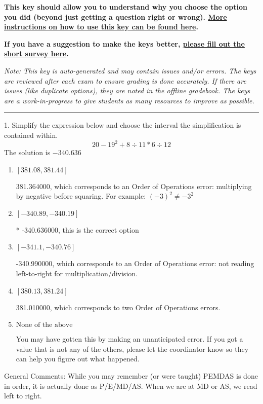\documentclass{article}[14pt]
\begin{document}
\textbf{This key should allow you to understand why you choose the option you did (beyond just getting a question right or wrong). \href{https://xronos.clas.ufl.edu/mac1105spring2020/courseDescriptionAndMisc/Exams/LearningFromResults}{More instructions on how to use this key can be found here}.}

\textbf{If you have a suggestion to make the keys better, \href{https://forms.gle/CZkbZmPbC9XALEE88}{please fill out the short survey here}.}

\textit{Note: This key is auto-generated and may contain issues and/or errors. The keys are reviewed after each exam to ensure grading is done accurately. If there are issues (like duplicate options), they are noted in the offline gradebook. The keys are a work-in-progress to give students as many resources to improve as possible.}

\rule{\textwidth}{0.4pt}

1. Simplify the expression below and choose the interval the simplification is contained within.
$$ 20 - 19^2 + 8 \div 11 * 6 \div 12 $$ 
The solution is $ -340.636 $ 

\begin{enumerate}[label=\Alph*.] 
\item $ [381.08, 381.44] $ 

  381.364000, which corresponds to an Order of Operations error: multiplying by negative before squaring. For example: $(-3)^2 \neq -3^2$ 
\item $ [-340.89, -340.19] $ 

 * -340.636000, this is the correct option 
\item $ [-341.1, -340.76] $ 

  -340.990000, which corresponds to an Order of Operations error: not reading left-to-right for multiplication/division. 
\item $ [380.13, 381.24] $ 

  381.010000, which corresponds to two Order of Operations errors. 
\item $ \text{None of the above} $ 

  You may have gotten this by making an unanticipated error. If you got a value that is not any of the others, please let the coordinator know so they can help you figure out what happened. 
\end{enumerate} 
 
General Comments: While you may remember (or were taught) PEMDAS is done in order, it is actually done as P/E/MD/AS. When we are at MD or AS, we read left to right.
\end{document}
